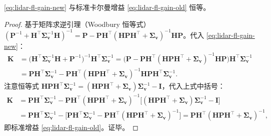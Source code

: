\begin{theorem}[两种卡尔曼增益公式等价]\label{thm:lidar-gain-equiv}
\cref{eq:lidar-fl-gain-new} 与标准卡尔曼增益 \cref{eq:lidar-fl-gain-old} 恒等。
\end{theorem}
\begin{proof}
基于矩阵求逆引理（Woodbury 恒等式）$(\mathbf{P}^{-1}+\mathbf{H}^\top\boldsymbol{\Sigma}_{\mathbf{v}}^{-1}\mathbf{H})^{-1}=\mathbf{P}-\mathbf{P}\mathbf{H}^\top(\mathbf{H}\mathbf{P}\mathbf{H}^\top+\boldsymbol{\Sigma}_{\mathbf{v}})^{-1}\mathbf{H}\mathbf{P}$。代入 \cref{eq:lidar-fl-gain-new}：
\begin{align*}
\mathbf{K}&=\big(\mathbf{H}^\top\boldsymbol{\Sigma}_{\mathbf{v}}^{-1}\mathbf{H}+\mathbf{P}^{-1}\big)^{-1}\mathbf{H}^\top\boldsymbol{\Sigma}_{\mathbf{v}}^{-1}
 =\Big(\mathbf{P}-\mathbf{P}\mathbf{H}^\top(\mathbf{H}\mathbf{P}\mathbf{H}^\top+\boldsymbol{\Sigma}_{\mathbf{v}})^{-1}\mathbf{H}\mathbf{P}\Big)\mathbf{H}^\top\boldsymbol{\Sigma}_{\mathbf{v}}^{-1}\\
&=\mathbf{P}\mathbf{H}^\top\boldsymbol{\Sigma}_{\mathbf{v}}^{-1}-\mathbf{P}\mathbf{H}^\top(\mathbf{H}\mathbf{P}\mathbf{H}^\top+\boldsymbol{\Sigma}_{\mathbf{v}})^{-1}\mathbf{H}\mathbf{P}\mathbf{H}^\top\boldsymbol{\Sigma}_{\mathbf{v}}^{-1}.
\end{align*}
注意恒等式 $\mathbf{H}\mathbf{P}\mathbf{H}^\top\boldsymbol{\Sigma}_{\mathbf{v}}^{-1}=(\mathbf{H}\mathbf{P}\mathbf{H}^\top+\boldsymbol{\Sigma}_{\mathbf{v}})\boldsymbol{\Sigma}_{\mathbf{v}}^{-1}-\mathbf{I}$，代入上式中括号：
\begin{align*}
\mathbf{K}&=\mathbf{P}\mathbf{H}^\top\boldsymbol{\Sigma}_{\mathbf{v}}^{-1}-\mathbf{P}\mathbf{H}^\top(\mathbf{H}\mathbf{P}\mathbf{H}^\top+\boldsymbol{\Sigma}_{\mathbf{v}})^{-1}\Big[(\mathbf{H}\mathbf{P}\mathbf{H}^\top+\boldsymbol{\Sigma}_{\mathbf{v}})\boldsymbol{\Sigma}_{\mathbf{v}}^{-1}-\mathbf{I}\Big]\\
&=\mathbf{P}\mathbf{H}^\top\boldsymbol{\Sigma}_{\mathbf{v}}^{-1}-\Big[\mathbf{P}\mathbf{H}^\top\boldsymbol{\Sigma}_{\mathbf{v}}^{-1}-\mathbf{P}\mathbf{H}^\top(\mathbf{H}\mathbf{P}\mathbf{H}^\top+\boldsymbol{\Sigma}_{\mathbf{v}})^{-1}\Big]
=\mathbf{P}\mathbf{H}^\top(\mathbf{H}\mathbf{P}\mathbf{H}^\top+\boldsymbol{\Sigma}_{\mathbf{v}})^{-1},
\end{align*}
即标准增益 \cref{eq:lidar-fl-gain-old}。证毕。
\end{proof}

